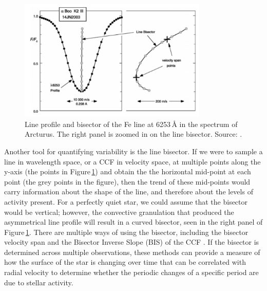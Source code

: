 \begin{figure}
    \centering
    \includegraphics[width=0.8\textwidth]{Bisector.pdf}
    \caption{Line profile and bisector of the Fe line at 6253\,\AA\: in the spectrum of Arcturus. The right panel is zoomed in on the line bisector. Source: \citet{2006Gray}.}
    \label{figBis}
\end{figure}

Another tool for quantifying variability is the line bisector. If we were to sample a line in wavelength space, or a CCF in velocity space, at multiple points along the y-axis (the points in Figure\,\ref{figBis}) and obtain the the horizontal mid-point at each point (the grey points in the figure), then the trend of these mid-points would carry information about the shape of the line, and therefore about the levels of activity present. For a perfectly quiet star, we could assume that the bisector would be vertical; however, the convective granulation that produced the asymmetrical line profile will result in a curved bisector, seen in the right panel of Figure\,\ref{figBis}. There are multiple ways of using the bisector, including the bisector velocity span \citep{1988Toner} and the Bisector Inverse Slope (BIS) of the CCF \citep{2001Queloz}. If the bisector is determined across multiple observations, these methods can provide a measure of how the surface of the star is changing over time that can be correlated with radial velocity to determine whether the periodic changes of a specific period are due to stellar activity.\\

